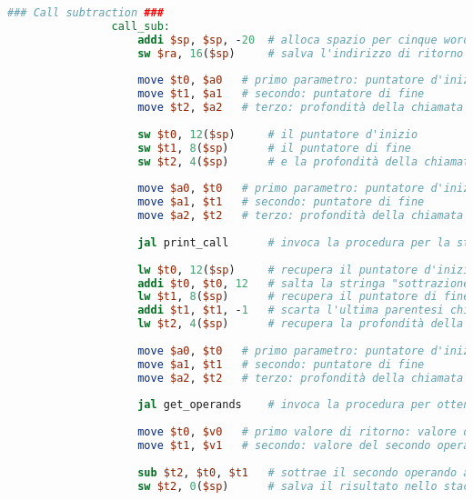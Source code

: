 \begin{center}
\begin{lstlisting}[language=mips, gobble=14, stepnumber=1]
                ### Call subtraction ###
                call_sub:
                    addi $sp, $sp, -20  # alloca spazio per cinque words nello stack frame
                    sw $ra, 16($sp)     # salva l'indirizzo di ritorno nello stack
                    
                    move $t0, $a0   # primo parametro: puntatore d'inizio
                    move $t1, $a1   # secondo: puntatore di fine
                    move $t2, $a2   # terzo: profondità della chiamata
                    
                    sw $t0, 12($sp)     # il puntatore d'inizio
                    sw $t1, 8($sp)      # il puntatore di fine
                    sw $t2, 4($sp)      # e la profondità della chiamata
                    
                    move $a0, $t0   # primo parametro: puntatore d'inizio
                    move $a1, $t1   # secondo: puntatore di fine
                    move $a2, $t2   # terzo: profondità della chiamata
                    
                    jal print_call      # invoca la procedura per la stampa dell'invocazione (con gli stessi parametri)
                    
                    lw $t0, 12($sp)     # recupera il puntatore d'inizio dallo stack
                    addi $t0, $t0, 12   # salta la stringa "sottrazione(" (12 caratteri)
                    lw $t1, 8($sp)      # recupera il puntatore di fine
                    addi $t1, $t1, -1   # scarta l'ultima parentesi chiusa
                    lw $t2, 4($sp)      # recupera la profondità della chiamata
                    
                    move $a0, $t0   # primo parametro: puntatore d'inizio
                    move $a1, $t1   # secondo: puntatore di fine
                    move $a2, $t2   # terzo: profondità della chiamata
                    
                    jal get_operands    # invoca la procedura per ottenere gli operandi
                    
                    move $t0, $v0   # primo valore di ritorno: valore del primo operando
                    move $t1, $v1   # secondo: valore del secondo operando
                    
                    sub $t2, $t0, $t1   # sottrae il secondo operando al primo
                    sw $t2, 0($sp)      # salva il risultato nello stack
                    

\end{lstlisting}
\end{center}
